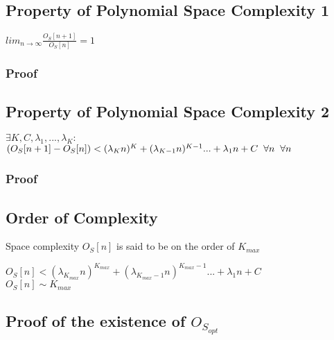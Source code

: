 \documentclass[11pt]{article}
\begin{document}
\subsection{Property of Polynomial Space Complexity 1}
\begin{center}
$
lim_{n \rightarrow \infty} \frac{O_S[n+1]}{O_S[n]} = 1
$
\end{center}
\subsubsection{Proof}







\subsection{Property of Polynomial Space Complexity 2}
\begin{center}
$
\exists K,C,\lambda_1,...,\lambda_K :
$
\\ \vspace{2mm}
$
( O_S[n+1] - O_S[n] ) < (\lambda_K n)^K + (\lambda_{K-1} n)^{K-1}... + \lambda_1 n + C \hspace{2mm} \forall n \hspace{2mm} \forall n
$
\end{center}
\subsubsection{Proof}








\subsection{Order of Complexity}
Space complexity $O_S[n]$ is said to be on the order of $K_{max}$
\begin{center}
$
O_S[n] < (\lambda_{K_{max}} n)^{K_{max}} + (\lambda_{K_{max}-1} n)^{K_{max}-1}... + \lambda_1 n + C
$
\\ \vspace{2mm}
$
O_S[n] \sim K_{max}
$
\end{center}




\subsection{Proof of the existence of $O_{S_{opt}}$}
\end{document}
